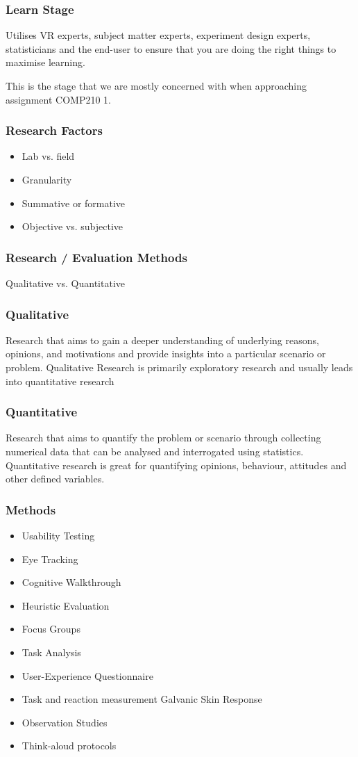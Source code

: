 \begin{frame}
	\frametitle{Learn Stage}
	Utilises VR experts, subject matter experts, experiment design experts, statisticians and the end-user to ensure that you are doing the right things to maximise learning. 
	
	\vspace{.2in}
	This is the stage that we are mostly concerned with when approaching assignment COMP210 1.
\end{frame}

\begin{frame}
	\frametitle{Research Factors}
	\begin{itemize}
		\item Lab vs. field
		\item Granularity
		\item Summative or formative
		\item Objective vs. subjective
	\end{itemize}
\end{frame}

\begin{frame}
	\frametitle{Research / Evaluation Methods}
	
	\huge Qualitative vs. Quantitative 
\end{frame}

\begin{frame}
	\frametitle{Qualitative}
	Research that aims to gain a deeper understanding of underlying reasons, opinions, and motivations and provide insights into a particular scenario or problem.  Qualitative Research is primarily exploratory research and usually leads into quantitative research 
	\end{frame}

\begin{frame}
	\frametitle{Quantitative}
	Research that aims to quantify the problem or scenario through collecting numerical data that can be analysed and interrogated using statistics. Quantitative research is great for quantifying opinions, behaviour, attitudes and other defined variables.
	\end{frame}	

\begin{frame}
	\frametitle{Methods}
	\begin{itemize}
		\item Usability Testing
		\item Eye Tracking
		\item Cognitive Walkthrough
		\item Heuristic Evaluation
		\item Focus Groups
		\item Task Analysis
		\item User-Experience Questionnaire
		\item Task and reaction measurement Galvanic Skin Response
		\item Observation Studies
		\item Think-aloud protocols
	\end{itemize}
\end{frame}

